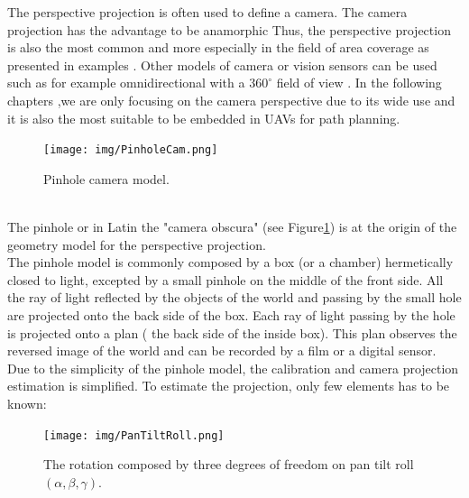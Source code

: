 The perspective projection is often used to define a camera. The camera projection has the advantage to be anamorphic 
Thus, the perspective projection is also the most common and more especially in the field of area coverage as presented in examples \cite{101*topcuoglu2009,33*reddy2012,8*zhou2011,82*chrysostomou2012,22*zhao2008}. Other models of camera or vision sensors can be used such as for example omnidirectional with a $360^{\circ}$ field of view \citep{43*erdem2006,150*chakrabarty2002,174*zhang2016}. 
In the following chapters ,we are only focusing on the camera perspective due to its wide use and it is also the most suitable to be embedded in UAVs for path planning. 
\begin{figure}[t!]
\begin{center}
   \texttt{[image: img/PinholeCam.png]}
  \caption{Pinhole camera model.}\label{fig:cameraObscura}
  \endminipage\hfill
\end{center}
\end{figure} 
\\The pinhole or in Latin the "camera obscura" (see Figure\ref{fig:cameraObscura}) is at the origin of the geometry model for the perspective projection.\\
The pinhole model is commonly composed by a box (or  a chamber) hermetically closed to light, excepted by a small pinhole on the middle of the front side. All the ray of light reflected by the objects of the world and passing by the small hole are projected onto the back side of the box. Each ray of light passing by the hole is  projected onto a plan ( the back side of the inside box). This plan observes the reversed image of the world and can be recorded by a film or a digital sensor. 
 Due to the simplicity of the pinhole model, the calibration and camera projection estimation is simplified. To estimate the projection, only few elements has to be known:
  
 
\begin{figure}[t!]
\begin{center}
   \texttt{[image: img/PanTiltRoll.png]}
  \caption{The rotation composed by three degrees of freedom on pan tilt roll $(\alpha,\beta,\gamma)$.}\label{fig:PanTiltRoll}
  \endminipage\hfill
  \end{center}
\end{figure}

